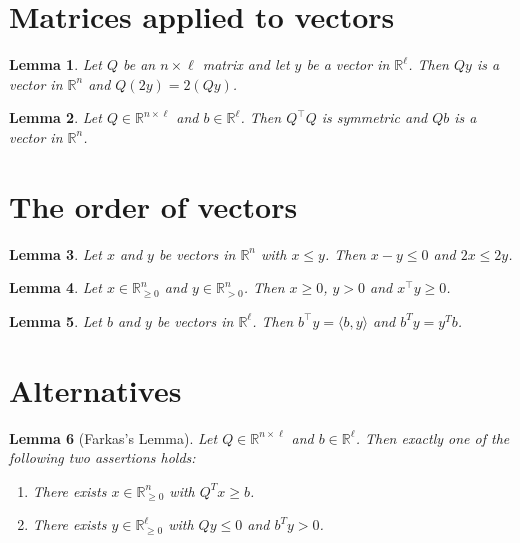 \documentclass{article}
\newtheorem{lemma}{Lemma}
\begin{document}
\section{Matrices applied to vectors}

\begin{lemma}\label{image}
Let $Q$ be an $n\times\ell$ matrix and let $y$ be a vector in $\mathbb{R}^\ell$. Then $Qy$ is a vector in $\mathbb{R}^n$ and $Q(2y)=2(Qy)$.
\end{lemma}

\begin{lemma}\label{signature}
Let $Q\in\mathbb{R}^{n\times\ell}$ and $b\in\mathbb{R}^\ell$. Then $Q^{\top}Q$ is symmetric and $Qb$ is a vector in $\mathbb{R}^n$.
\end{lemma}

\section{The order of vectors}

\begin{lemma}\label{order}
Let $x$ and $y$ be vectors in $\mathbb{R}^n$ with $x\le y$. Then $x-y\le 0$ and $2x\le 2y$.
\end{lemma}

\begin{lemma}\label{orthant}
Let $x\in\mathbb{R}_{\ge 0}^n$ and $y\in\mathbb{R}_{>0}^n$. Then $x\ge 0$, $y>0$ and $x^{\top}y\ge0$.
\end{lemma}

\begin{lemma}\label{inner}
Let $b$ and $y$ be vectors in $\mathbb{R}^\ell$. Then $b^{\top}y=\langle b,y\rangle$ and $b^Ty=y^Tb$.
\end{lemma}

\section{Alternatives}

\begin{lemma}[Farkas's Lemma]\label{farkas}
Let $Q \in \mathbb{R}^{n \times \ell}$ and $b \in \mathbb{R}^\ell$.
Then exactly one of the following two assertions holds:
\begin{enumerate}
\item There exists $x \in \mathbb{R}_{\ge 0}^n$ with $Q^T x \ge b$.\label{Farkas1}
\item There exists $y \in \mathbb{R}_{\ge 0}^\ell$ with $Qy \le 0$ and $b^T y > 0$.
\end{enumerate}
\end{lemma}
\end{document}
